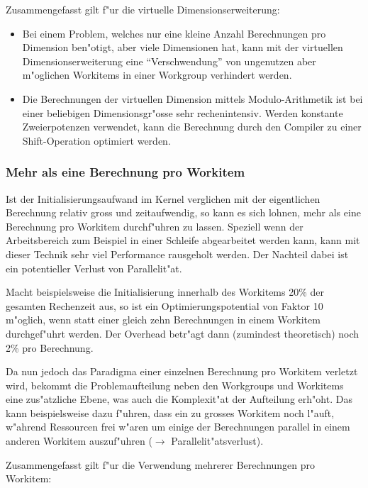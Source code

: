 \begin{refsection}
Zusammengefasst gilt f"ur die virtuelle Dimensionserweiterung:

\begin{itemize}
 \item Bei einem Problem, welches nur eine kleine Anzahl Berechnungen pro 
       Dimension ben"otigt, aber viele Dimensionen hat, kann mit der
       virtuellen Dimensionserweiterung eine ``Verschwendung'' von
       ungenutzen aber m"oglichen Workitems in einer Workgroup verhindert 
       werden.
 \item Die Berechnungen der virtuellen Dimension mittels Modulo-Arithmetik 
       ist bei einer beliebigen Dimensionsgr"osse sehr rechenintensiv.
			 Werden konstante Zweierpotenzen verwendet, kann die Berechnung durch den
			 Compiler zu einer Shift-Operation optimiert werden.
\end{itemize}


\subsubsection{Mehr als eine Berechnung pro Workitem}

Ist der Initialisierungsaufwand im Kernel verglichen mit der eigentlichen
Berechnung relativ gross und zeitaufwendig, so kann es sich lohnen, mehr als
eine Berechnung pro Workitem durchf"uhren zu lassen. Speziell wenn der
Arbeitsbereich zum Beispiel in einer Schleife abgearbeitet werden kann, kann mit
dieser Technik sehr viel Performance rausgeholt werden. Der Nachteil dabei ist
ein potentieller Verlust von Parallelit"at.

Macht beispielsweise die Initialisierung innerhalb des Workitems 20\% der
gesamten Rechenzeit aus, so ist ein Optimierungspotential von Faktor 10
m"oglich, wenn statt einer gleich zehn Berechnungen in einem Workitem
durchgef"uhrt werden. Der Overhead betr"agt dann (zumindest theoretisch) noch
2\% pro Berechnung. 

Da nun jedoch das Paradigma einer einzelnen Berechnung pro Workitem verletzt
wird, bekommt die Problemaufteilung neben den Workgroups und Workitems eine
zus"atzliche Ebene, was auch die Komplexit"at der Aufteilung erh"oht. Das kann
beispielsweise dazu f"uhren, dass ein zu grosses Workitem noch l"auft, w"ahrend
Ressourcen frei w"aren um einige der Berechnungen parallel in einem anderen
Workitem auszuf"uhren ($\rightarrow$ Parallelit"atsverlust).

Zusammengefasst gilt f"ur die Verwendung mehrerer Berechnungen pro Workitem:


\end{refsection}
